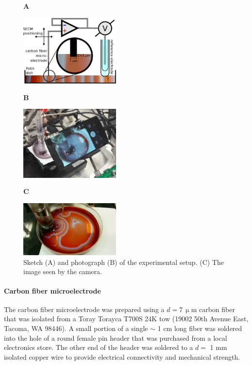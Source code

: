 \documentclass[3p]{elsarticle}
\begin{document}
\begin{figure}[!p]
\centering
\begin{flushleft}
\hspace{4cm} \textbf{A}
\end{flushleft}

\includegraphics[width=0.45\textwidth]{setup.eps}

\begin{flushleft}
\hspace{4cm} \textbf{B}
\end{flushleft}

\includegraphics[width=0.45\textwidth]{setup_photo.jpg}

\begin{flushleft}
\hspace{4cm} \textbf{C}
\end{flushleft}

\includegraphics[width=0.45\textwidth]{0.png}

\caption{
Sketch (A) and photograph (B) of the experimental setup. (C) The image seen by the camera.
}
\label{fig:setup}
\end{figure}



\paragraph{Carbon fiber microelectrode} The carbon fiber microelectrode was prepared using a $d=7\, \upmu$m carbon fiber that was isolated from a Toray Torayca T700S 24K tow (19002 50th Avenue East, Tacoma, WA 98446).
A small portion of a single $\sim$ 1 cm long fiber was soldered into the hole of a round female pin header that was purchased from a local electronics store. 
The other end of the header was soldered to a $d=$ 1 mm isolated copper wire to provide electrical connectivity and mechanical strength. 
\end{document}
